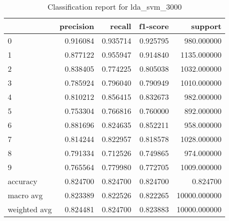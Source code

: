 \begin{table}[htb!]
\centering
\caption{Classification report for lda_svm_3000}
\label{tab:classification-report-lda_svm_3000}
\begin{tabular}{lrrrr}
\toprule
 & precision & recall & f1-score & support \\
\midrule
0 & 0.916084 & 0.935714 & 0.925795 & 980.000000 \\
1 & 0.877122 & 0.955947 & 0.914840 & 1135.000000 \\
2 & 0.838405 & 0.774225 & 0.805038 & 1032.000000 \\
3 & 0.785924 & 0.796040 & 0.790949 & 1010.000000 \\
4 & 0.810212 & 0.856415 & 0.832673 & 982.000000 \\
5 & 0.753304 & 0.766816 & 0.760000 & 892.000000 \\
6 & 0.881696 & 0.824635 & 0.852211 & 958.000000 \\
7 & 0.814244 & 0.822957 & 0.818578 & 1028.000000 \\
8 & 0.791334 & 0.712526 & 0.749865 & 974.000000 \\
9 & 0.765564 & 0.779980 & 0.772705 & 1009.000000 \\
accuracy & 0.824700 & 0.824700 & 0.824700 & 0.824700 \\
macro avg & 0.823389 & 0.822526 & 0.822265 & 10000.000000 \\
weighted avg & 0.824481 & 0.824700 & 0.823883 & 10000.000000 \\
\bottomrule
\end{tabular}
\end{table}
